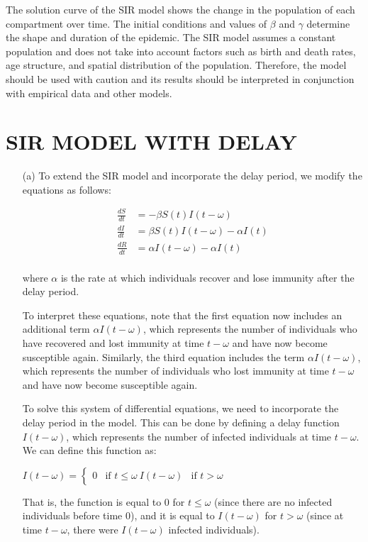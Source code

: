 \documentclass{article}
\begin{document}
The solution curve of the SIR model shows the change in the population of each compartment over time. The initial conditions and values of $\beta$ and $\gamma$ determine the shape and duration of the epidemic. The SIR model assumes a constant population and does not take into account factors such as birth and death rates, age structure, and spatial distribution of the population. Therefore, the model should be used with caution and its results should be interpreted in conjunction with empirical data and other models.

\section{SIR MODEL WITH DELAY}
\begin{enumerate}
\item[(a)] To extend the SIR model and incorporate the delay period, we modify the equations as follows:

\begin{align}
\frac{dS}{dt} &= -\beta S(t)I(t-\omega) \\
\frac{dI}{dt} &= \beta S(t)I(t-\omega) - \alpha I(t) \\ 
\frac{dR}{dt} &= \alpha I(t-\omega) - \alpha I(t) \\
\end{align}

where $\alpha$ is the rate at which individuals recover and lose immunity after the delay period.

To interpret these equations, note that the first equation now includes an additional term $\alpha I(t-\omega)$, which represents the number of individuals who have recovered and lost immunity at time $t-\omega$ and have now become susceptible again. Similarly, the third equation includes the term $\alpha I(t-\omega)$, which represents the number of individuals who lost immunity at time $t-\omega$ and have now become susceptible again.

To solve this system of differential equations, we need to incorporate the delay period in the model. This can be done by defining a delay function $I(t-\omega)$, which represents the number of infected individuals at time $t-\omega$. We can define this function as:

$I(t-\omega) = \begin{cases} 0 & \text{if } t \leq \omega \ I(t-\omega) & \text {if } t > \omega \end{cases}$ 

That is, the function is equal to 0 for $t \leq \omega$ (since there are no infected individuals before time 0), and it is equal to $I(t-\omega)$ for $t > \omega$ (since at time $t-\omega$, there were $I(t-\omega)$ infected individuals).


\end{enumerate}
\end{document}

